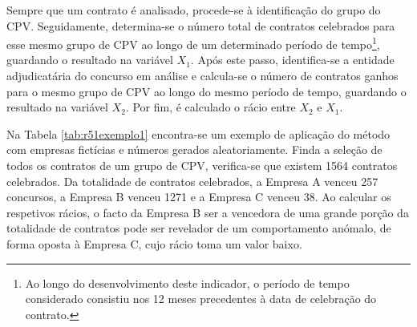 Sempre que um contrato é analisado, procede-se à identificação do grupo do CPV. Seguidamente, determina-se o número total de contratos celebrados para esse mesmo grupo de CPV ao longo de um determinado período de tempo\footnote{Ao longo do desenvolvimento deste indicador, o período de tempo considerado consistiu nos 12 meses precedentes à data de celebração do contrato.}, guardando o resultado na variável $X_1$. Após este passo, identifica-se a entidade adjudicatária do concurso em análise e calcula-se o número de contratos ganhos para o mesmo grupo de CPV ao longo do mesmo período de tempo, guardando o resultado na variável $X_2$. Por fim, é calculado o rácio entre $X_2$ e $X_1$. 

Na Tabela \ref{tab:r51exemplo1} encontra-se um exemplo de aplicação do método com empresas fictícias e números gerados aleatoriamente. Finda a seleção de todos os contratos de um grupo de CPV, verifica-se que existem 1564 contratos celebrados. Da totalidade de contratos celebrados, a Empresa A venceu 257 concursos, a Empresa B venceu 1271 e a Empresa C venceu 38. Ao calcular os respetivos rácios, o facto da Empresa B ser a vencedora de uma grande porção da totalidade de contratos pode ser revelador de um comportamento anómalo, de forma oposta à Empresa C, cujo rácio toma um valor baixo. 

\begin{table}[H]
	\centering
	\renewcommand{\arraystretch}{1.15}
	\setlength{\tabcolsep}{15pt}
	\caption{Exemplo da abordagem 2 para um conjunto de empresas fictícias de um determinado grupo de CPV.}
	\label{tab:r51exemplo1}
\end{table}




